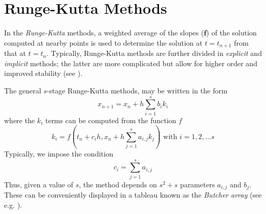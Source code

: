 \section{Runge-Kutta Methods}\label{sec:runge-kutta}

In the \emph{Runge-Kutta} methods, a weighted average of the slopes ($\bm{f}$) of 
the solution computed at nearby points is used to determine the solution at 
$t = t_{n+1}$ from that at $t = t_n$. Typically, Runge-Kutta methods are further 
divided in \emph{explicit} and \emph{implicit} methods; the latter are more complicated 
but allow for higher order and improved stability (see \cite{Griffiths2010}).

The general $s$-stage Runge-Kutta methods, may be written in the form
\begin{equation}\label{eq:grif95}
    x_{n+1} = x_n + h \sum_{i=1}^{s} b_i k_i 
\end{equation}
where the $k_i$ terms can be computed from the function $f$
\begin{equation}\label{eq:grif96}
    k_i = f \left( t_n + c_i h , x_n + h \sum_{j=1}^{s} a_{i,j} k_j \right) \text{ with } i = 1,2,\dots s
\end{equation}
Typically, we impose the condition
\begin{equation}
    c_i = \sum_{j=1}^{s} a_{i,j}
\end{equation}
Thus, given a value of $s$, the method depends on $s^2 + s$ parameters $a_{i,j}$ and $b_j$.
These can be conveniently displayed in a tableau known as the \emph{Butcher array} 
(see e.g. \cite{Butcher2016}).

